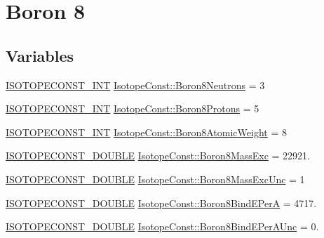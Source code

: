 \hypertarget{group___isotope_const-_boron-_b8}{}\section{Boron 8}
\label{group___isotope_const-_boron-_b8}
\subsection*{Variables}
\begin{DoxyCompactItemize}
\item 
\mbox{\hyperlink{group___isotope_const-_macros_ga5f18360b3e99483a35c32d789e62621c}{I\+S\+O\+T\+O\+P\+E\+C\+O\+N\+S\+T\+\_\+\+I\+NT}} \mbox{\hyperlink{group___isotope_const-_boron-_b8_gadfd0f0e540eaa7b2312297f906b115b9}{Isotope\+Const\+::\+Boron8\+Neutrons}} = 3
\item 
\mbox{\hyperlink{group___isotope_const-_macros_ga5f18360b3e99483a35c32d789e62621c}{I\+S\+O\+T\+O\+P\+E\+C\+O\+N\+S\+T\+\_\+\+I\+NT}} \mbox{\hyperlink{group___isotope_const-_boron-_b8_ga8d61a543864f36c79f4a892e0bd84a41}{Isotope\+Const\+::\+Boron8\+Protons}} = 5
\item 
\mbox{\hyperlink{group___isotope_const-_macros_ga5f18360b3e99483a35c32d789e62621c}{I\+S\+O\+T\+O\+P\+E\+C\+O\+N\+S\+T\+\_\+\+I\+NT}} \mbox{\hyperlink{group___isotope_const-_boron-_b8_ga6c3f5d2684749ad7ec4403beaeefdffa}{Isotope\+Const\+::\+Boron8\+Atomic\+Weight}} = 8
\item 
\mbox{\hyperlink{group___isotope_const-_macros_ga8f45a7272ce02c0b4c65c44636ed719a}{I\+S\+O\+T\+O\+P\+E\+C\+O\+N\+S\+T\+\_\+\+D\+O\+U\+B\+LE}} \mbox{\hyperlink{group___isotope_const-_boron-_b8_ga4d21c586a7a001b980746838a40ec773}{Isotope\+Const\+::\+Boron8\+Mass\+Exc}} = 22921.
\item 
\mbox{\hyperlink{group___isotope_const-_macros_ga8f45a7272ce02c0b4c65c44636ed719a}{I\+S\+O\+T\+O\+P\+E\+C\+O\+N\+S\+T\+\_\+\+D\+O\+U\+B\+LE}} \mbox{\hyperlink{group___isotope_const-_boron-_b8_gaddc20d490f69cb9bd11c7a0b96db861b}{Isotope\+Const\+::\+Boron8\+Mass\+Exc\+Unc}} = 1
\item 
\mbox{\hyperlink{group___isotope_const-_macros_ga8f45a7272ce02c0b4c65c44636ed719a}{I\+S\+O\+T\+O\+P\+E\+C\+O\+N\+S\+T\+\_\+\+D\+O\+U\+B\+LE}} \mbox{\hyperlink{group___isotope_const-_boron-_b8_ga076c9ec8b6e9ed2a0d0ae2820f7f58ce}{Isotope\+Const\+::\+Boron8\+Bind\+E\+PerA}} = 4717.
\item 
\mbox{\hyperlink{group___isotope_const-_macros_ga8f45a7272ce02c0b4c65c44636ed719a}{I\+S\+O\+T\+O\+P\+E\+C\+O\+N\+S\+T\+\_\+\+D\+O\+U\+B\+LE}} \mbox{\hyperlink{group___isotope_const-_boron-_b8_ga8cdbcf2bfb7fe3a01a29d8c16c6ada00}{Isotope\+Const\+::\+Boron8\+Bind\+E\+Per\+A\+Unc}} = 0.

\end{DoxyCompactItemize}
